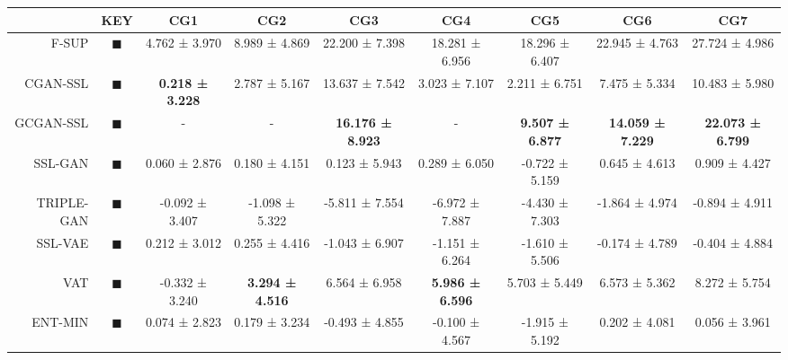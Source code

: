 \begin{tabular}{rcccccccc}
\toprule
{} &                                                                      KEY &                     CG1 &                     CG2 &                      CG3 &                     CG4 &                     CG5 &                      CG6 &                      CG7 \\
\midrule
F-SUP      &           \textcolor{FULLY_SUPERVISED_CLASSIFIER}{\LARGE $\blacksquare$} &           4.762 ± 3.970 &           8.989 ± 4.869 &           22.200 ± 7.398 &          18.281 ± 6.956 &          18.296 ± 6.407 &           22.945 ± 4.763 &           27.724 ± 4.986 \\
CGAN-SSL   &   \textcolor{CGAN_BASIC_DJ_SUPERVISED_CLASSIFIER}{\LARGE $\blacksquare$} &  \textbf{0.218 ± 3.228} &           2.787 ± 5.167 &           13.637 ± 7.542 &           3.023 ± 7.107 &           2.211 ± 6.751 &            7.475 ± 5.334 &           10.483 ± 5.980 \\
GCGAN-SSL  &  \textcolor{CGAN_GUMBEL_DJ_SUPERVISED_CLASSIFIER}{\LARGE $\blacksquare$} &               - &               - &  \textbf{16.176 ± 8.923} &               - &  \textbf{9.507 ± 6.877} &  \textbf{14.059 ± 7.229} &  \textbf{22.073 ± 6.799} \\
SSL-GAN    &                               \textcolor{SSL_GAN}{\LARGE $\blacksquare$} &           0.060 ± 2.876 &           0.180 ± 4.151 &            0.123 ± 5.943 &           0.289 ± 6.050 &          -0.722 ± 5.159 &            0.645 ± 4.613 &            0.909 ± 4.427 \\
TRIPLE-GAN &                            \textcolor{TRIPLE_GAN}{\LARGE $\blacksquare$} &          -0.092 ± 3.407 &          -1.098 ± 5.322 &           -5.811 ± 7.554 &          -6.972 ± 7.887 &          -4.430 ± 7.303 &           -1.864 ± 4.974 &           -0.894 ± 4.911 \\
SSL-VAE    &                               \textcolor{SSL_VAE}{\LARGE $\blacksquare$} &           0.212 ± 3.012 &           0.255 ± 4.416 &           -1.043 ± 6.907 &          -1.151 ± 6.264 &          -1.610 ± 5.506 &           -0.174 ± 4.789 &           -0.404 ± 4.884 \\
VAT        &                                   \textcolor{VAT}{\LARGE $\blacksquare$} &          -0.332 ± 3.240 &  \textbf{3.294 ± 4.516} &            6.564 ± 6.958 &  \textbf{5.986 ± 6.596} &           5.703 ± 5.449 &            6.573 ± 5.362 &            8.272 ± 5.754 \\
ENT-MIN    &                  \textcolor{ENTROPY_MINIMISATION}{\LARGE $\blacksquare$} &           0.074 ± 2.823 &           0.179 ± 3.234 &           -0.493 ± 4.855 &          -0.100 ± 4.567 &          -1.915 ± 5.192 &            0.202 ± 4.081 &            0.056 ± 3.961 \\

\end{tabular}
